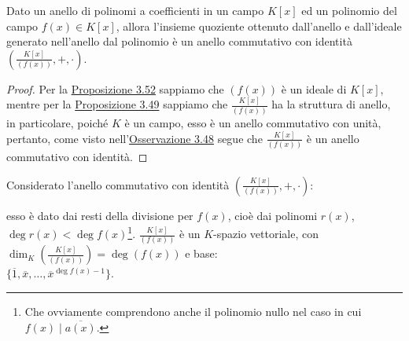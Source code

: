 \documentclass[11pt]{scrartcl}
\begin{document}
\begin{corollary}
Dato un anello di polinomi a coefficienti in un campo $K[x]$ ed un polinomio del campo $f(x) \in K[x]$, allora l'insieme quoziente ottenuto dall'anello e dall'ideale generato nell'anello dal polinomio è un anello commutativo con identità $\left(\frac{K[x]}{(f(x))}, +, \cdot\right)$.
\end{corollary}

\begin{proof}
Per la \hyperref[p:3.51]{Proposizione 3.52} sappiamo che $(f(x))$ è un ideale di $K[x]$, mentre per la \hyperref[p:3.50]{Proposizione 3.49} sappiamo che $\frac{K[x]}{(f(x))}$  ha la struttura di anello, in particolare, poiché $K$ è un campo, esso è un anello commutativo con unità, pertanto,
come visto nell'\hyperref[p:3.49]{Osservazione 3.48} segue che $\frac{K[x]}{(f(x))}$ è un anello commutativo con identità.
\end{proof}

\begin{theorem}
\label{p:3.53}
Considerato l'anello commutativo con identità $\left(\frac{K[x]}{(f(x))}, +, \cdot\right)$:
\begin{itemize}
	\ii esso è dato dai resti della divisione per $f(x)$, cioè dai polinomi $r(x)$,  $\deg r(x)<\deg f(x)$\footnote{Che ovviamente comprendono anche il polinomio nullo nel caso in cui $f(x) \mid \overline{a(x)}$.}.                      
    \ii $\frac{K[x]}{(f(x))}$ è un $K$-spazio vettoriale, con $\dim_K\left(\frac{K[x]}{(f(x))}\right) = \deg(f(x))$ e base:\\
	 $\{\overline 1, \overline x, \ldots , \overline{x}^{\deg f(x)-1}\}$.
\end{itemize}
\end{theorem}
\end{document}
